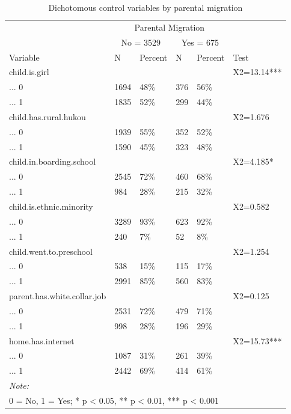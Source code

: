 \documentclass[
  man]{apa7}
\begin{document}
\begin{table}

\caption{\label{tab:tab-ctvar-dit}Dichotomous control variables by parental migration}
\centering
\begin{tabular}[t]{llllll}
\toprule
\multicolumn{1}{c}{ } & \multicolumn{4}{c}{Parental Migration} \\
\cmidrule(l{3pt}r{3pt}){2-5}
\multicolumn{1}{c}{ } & \multicolumn{2}{c}{No = 3529} & \multicolumn{2}{c}{Yes = 675} \\
\cmidrule(l{3pt}r{3pt}){2-3} \cmidrule(l{3pt}r{3pt}){4-5}
Variable & N & Percent & N & Percent & Test\\
\midrule
child.is.girl &  &  &  &  & X2=13.14***\\
... 0 & 1694 & 48\% & 376 & 56\% & \\
... 1 & 1835 & 52\% & 299 & 44\% & \\
child.has.rural.hukou &  &  &  &  & X2=1.676\\
... 0 & 1939 & 55\% & 352 & 52\% & \\
\addlinespace
... 1 & 1590 & 45\% & 323 & 48\% & \\
child.in.boarding.school &  &  &  &  & X2=4.185*\\
... 0 & 2545 & 72\% & 460 & 68\% & \\
... 1 & 984 & 28\% & 215 & 32\% & \\
child.is.ethnic.minority &  &  &  &  & X2=0.582\\
\addlinespace
... 0 & 3289 & 93\% & 623 & 92\% & \\
... 1 & 240 & 7\% & 52 & 8\% & \\
child.went.to.preschool &  &  &  &  & X2=1.254\\
... 0 & 538 & 15\% & 115 & 17\% & \\
... 1 & 2991 & 85\% & 560 & 83\% & \\
\addlinespace
parent.has.white.collar.job &  &  &  &  & X2=0.125\\
... 0 & 2531 & 72\% & 479 & 71\% & \\
... 1 & 998 & 28\% & 196 & 29\% & \\
home.has.internet &  &  &  &  & X2=15.73***\\
... 0 & 1087 & 31\% & 261 & 39\% & \\
\addlinespace
... 1 & 2442 & 69\% & 414 & 61\% & \\
\bottomrule
\multicolumn{6}{l}{\rule{0pt}{1em}\textit{Note: }}\\
\multicolumn{6}{l}{\rule{0pt}{1em}0 = No, 1 = Yes; * p < 0.05, ** p < 0.01, *** p < 0.001}\\
\end{tabular}
\end{table}
\end{document}

